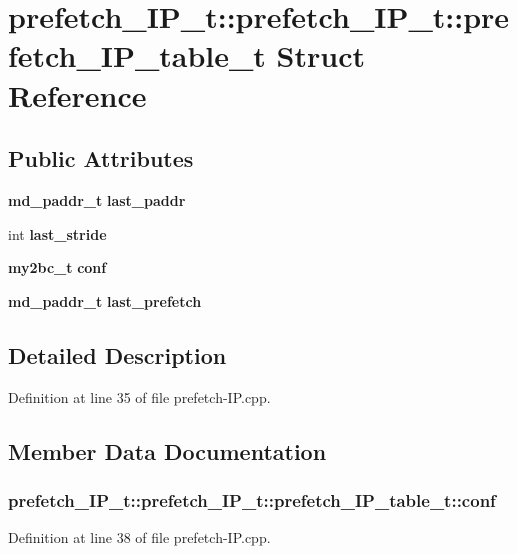 \section{prefetch\_\-IP\_\-t::prefetch\_\-IP\_\-t::prefetch\_\-IP\_\-table\_\-t Struct Reference}
\label{structprefetch__IP__t_1_1prefetch__IP__table__t}
\subsection*{Public Attributes}
\begin{CompactItemize}
\item 
{\bf md\_\-paddr\_\-t} {\bf last\_\-paddr}
\item 
int {\bf last\_\-stride}
\item 
{\bf my2bc\_\-t} {\bf conf}
\item 
{\bf md\_\-paddr\_\-t} {\bf last\_\-prefetch}
\end{CompactItemize}


\subsection{Detailed Description}


Definition at line 35 of file prefetch-IP.cpp.

\subsection{Member Data Documentation}
\subsubsection[{conf}]{ prefetch\_\-IP\_\-t::prefetch\_\-IP\_\-t::prefetch\_\-IP\_\-table\_\-t::conf}\label{structprefetch__IP__t_1_1prefetch__IP__table__t_590924fee4503f8f603c2ac7cde68669}




Definition at line 38 of file prefetch-IP.cpp.
